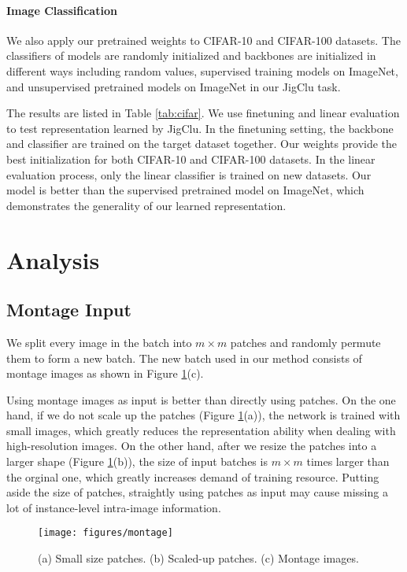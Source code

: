 \documentclass[final]{cvpr}
\begin{document}
\paragraph{Image Classification}
We also apply our pretrained weights to CIFAR-10 and CIFAR-100 datasets. The classifiers of models are randomly initialized and backbones are initialized in different ways including random values, supervised training models on ImageNet, and unsupervised pretrained models on ImageNet in our JigClu task. 

The results are listed in Table \ref{tab:cifar}. We use finetuning and linear evaluation to test representation learned by JigClu. In the finetuning setting, the backbone and classifier are trained on the target dataset together. Our weights provide the best initialization for both CIFAR-10 and CIFAR-100 datasets. In the linear evaluation process, only the linear classifier is trained on new datasets. Our model is better than the supervised pretrained model on ImageNet, which demonstrates the generality of our learned representation.

\section{Analysis}
\label{sec:abl}



\subsection{Montage Input} 
We split every image in the batch into $m\times m$ patches and randomly permute them to form a new batch. The new batch used in our method consists of montage images as shown in Figure \ref{fig:montage}(c). 

Using montage images as input is better than directly using patches. 
On the one hand, if we do not scale up the patches (Figure \ref{fig:montage}(a)), the network is trained with small images, which greatly reduces the representation ability when dealing with high-resolution images. On the other hand, after we resize the patches into a larger shape (Figure \ref{fig:montage}(b)), the size of input batches is $m\times m$ times larger than the orginal one, which greatly increases demand of training resource. Putting aside the size of patches, straightly using patches as input may cause missing a lot of instance-level intra-image information. 

\begin{figure}
	\centering
	\texttt{[image: figures/montage]}
	\caption{(a) Small size patches. (b) Scaled-up patches. (c) Montage images.}
	\label{fig:montage}
\end{figure}
\end{document}
